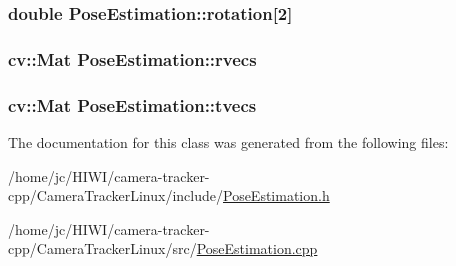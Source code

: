 \subsubsection[{\texorpdfstring{rotation}{rotation}}]{\setlength{\rightskip}{0pt plus 5cm}double Pose\+Estimation\+::rotation\mbox{[}2\mbox{]}\hspace{0.3cm}{\ttfamily [private]}}\hypertarget{class_pose_estimation_a6f4078b9cf03b4dbee49cfcd32bc0b07}{}\label{class_pose_estimation_a6f4078b9cf03b4dbee49cfcd32bc0b07}
\subsubsection[{\texorpdfstring{rvecs}{rvecs}}]{\setlength{\rightskip}{0pt plus 5cm}cv\+::\+Mat Pose\+Estimation\+::rvecs\hspace{0.3cm}{\ttfamily [private]}}\hypertarget{class_pose_estimation_a58c73c54cbdab59e168f1645c6cba239}{}\label{class_pose_estimation_a58c73c54cbdab59e168f1645c6cba239}
\subsubsection[{\texorpdfstring{tvecs}{tvecs}}]{\setlength{\rightskip}{0pt plus 5cm}cv\+::\+Mat Pose\+Estimation\+::tvecs\hspace{0.3cm}{\ttfamily [private]}}\hypertarget{class_pose_estimation_a60141045de99ad2f8b9c87471a198afe}{}\label{class_pose_estimation_a60141045de99ad2f8b9c87471a198afe}


The documentation for this class was generated from the following files\+:\begin{DoxyCompactItemize}
\item 
/home/jc/\+H\+I\+W\+I/camera-\/tracker-\/cpp/\+Camera\+Tracker\+Linux/include/\hyperlink{_pose_estimation_8h}{Pose\+Estimation.\+h}\item 
/home/jc/\+H\+I\+W\+I/camera-\/tracker-\/cpp/\+Camera\+Tracker\+Linux/src/\hyperlink{_pose_estimation_8cpp}{Pose\+Estimation.\+cpp}\end{DoxyCompactItemize}
